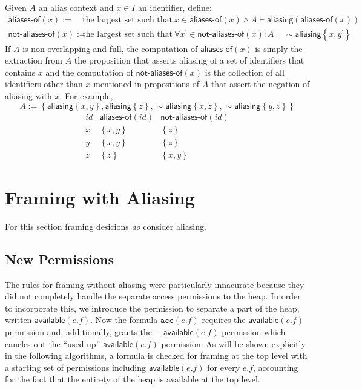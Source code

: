 \documentclass{article}
\newcommand{\tsf}{\textsf}
\newcommand{\tit}{\textit}
\newcommand{\ttt}{\texttt}
\newcommand{\set}[1]{\left\{ #1 \right\}}
\newcommand{\p}{^\prime}
\newcommand{\entails}{\vdash}
\newcommand{\pnot}{\sim}
\newcommand{\cacc}{\ttt{acc}}
\newcommand{\aliasing}{\tsf{aliasing}}
\newcommand{\available}{\tsf{available}}
\begin{document}
Given $A$ an alias context and $x \in I$ an identifier, define:
\begin{align*}
  \tsf{aliases-of}(x)
  := & \
  \text{the largest set such that} \
  x \in \tsf{aliases-of}(x) \land A \entails \aliasing (\tsf{aliases-of}(x))
  \\
  \tsf{not-aliases-of}(x)
  := & \
  \text{the largest set such that} \
  \forall x\p \in \tsf{not-aliases-of}(x) : A \entails \pnot \aliasing\set{x,y\p}
\end{align*}
If $A$ is non-overlapping and full,
the computation of $\tsf{aliases-of}(x)$ is simply the extraction from $A$ the proposition that asserts aliasing of a set of identifiers that contains $x$
and the computation of $\tsf{not-aliases-of}(x)$ is the collection of all identifiers other than $x$ mentioned in propositions of $A$ that assert the negation of aliasing with $x$. For example,
$$
A := \set{ \aliasing\set{x,y}, \aliasing\set{z}, \pnot\aliasing\set{x,z}, \pnot\aliasing\set{y,z} }
$$
$$
\begin{array}{c|c|c}
\tit{id} & \tsf{aliases-of}(\tit{id}) & \tsf{not-aliases-of}(\tit{id})
\\ \hline
x & \set{x,y} & \set{z} \\
y & \set{x,y} & \set{z} \\
z & \set{z}   & \set{x,y}
\end{array}
$$


\newpage
\section{Framing with Aliasing}

For this section framing desicions \tit{do} consider aliasing.

\subsection{New Permissions}

The rules for framing without aliasing were particularly innacurate because they did not completely handle the separate access permissions to the heap.
In order to incorporate this, we introduce the permission to separate a part of the heap, written $\available(e.f)$.
Now the formula $\cacc(e.f)$ requires the $\available(e.f)$ permission and, additionally, grants the $- \ \available(e.f)$ permission which cancles out the ``used up'' $\available(e.f)$ permission.
As will be shown explicitly in the following algorithms, a formula is checked for framing at the top level with a starting set of permissions including $\available(e.f)$ for every $e.f$, accounting for the fact that the entirety of the heap is available at the top level.
\end{document}

